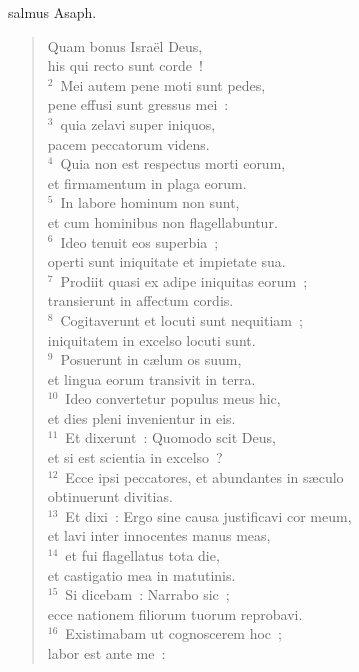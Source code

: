 \bchapter
{}salmus Asaph. \begin{flushleft}\begin{verse}\vspace{6pt}Quam bonus Isra\"el Deus,\\ his qui recto sunt corde~!\\
${}^{2}$~Mei autem pene moti sunt pedes,\\ pene effusi sunt gressus mei~:\\
${}^{3}$~quia zelavi super iniquos,\\ pacem peccatorum videns.\\
${}^{4}$~Quia non est respectus morti eorum,\\ et firmamentum in plaga eorum.\\
${}^{5}$~In labore hominum non sunt,\\ et cum hominibus non flagellabuntur.\\
${}^{6}$~Ideo tenuit eos superbia~;\\ operti sunt iniquitate et impietate sua.\\
${}^{7}$~Prodiit quasi ex adipe iniquitas eorum~;\\ transierunt in affectum cordis.\\
${}^{8}$~Cogitaverunt et locuti sunt nequitiam~;\\ iniquitatem in excelso locuti sunt.\\
${}^{9}$~Posuerunt in c\ae lum os suum,\\ et lingua eorum transivit in terra.\\
${}^{10}$~Ideo convertetur populus meus hic,\\ et dies pleni invenientur in eis.\\
${}^{11}$~Et dixerunt~: Quomodo scit Deus,\\ et si est scientia in excelso~?\\
${}^{12}$~Ecce ipsi peccatores, et abundantes in s\ae culo\\ obtinuerunt divitias.\\
${}^{13}$~Et dixi~: Ergo sine causa justificavi cor meum,\\ et lavi inter innocentes manus meas,\\
${}^{14}$~et fui flagellatus tota die,\\ et castigatio mea in matutinis.\\
${}^{15}$~Si dicebam~: Narrabo sic~;\\ ecce nationem filiorum tuorum reprobavi.\\
${}^{16}$~Existimabam ut cognoscerem hoc~;\\ labor est ante me~:\\

\end{verse}
\end{flushleft}
